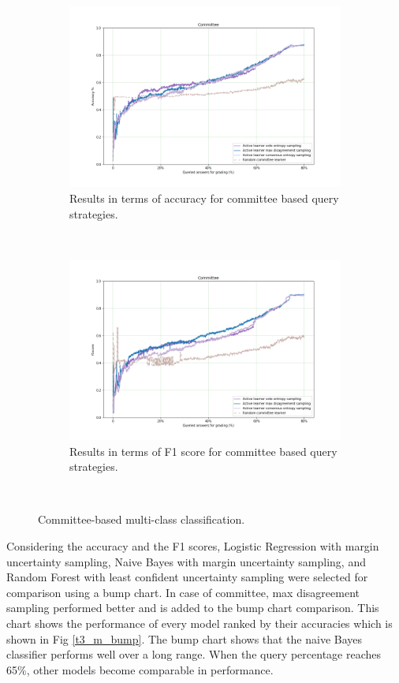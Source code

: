 \begin{figure}[!htb]
	\begin{subfigure}[b]{0.5\textwidth}
		\includegraphics[width=\textwidth]{images/task3_accuracy_com}
		\caption{Results in terms of accuracy for committee based query strategies.}
		\label{t3_m_com}
	\end{subfigure}
	~
	\begin{subfigure}[b]{0.5\textwidth}
		\includegraphics[width=\textwidth]{images/task3_f1score_com}
		\caption{Results in terms of F1 score for committee based query strategies.}
		\label{t3_m_com_f1}
	\end{subfigure}
	~
	\caption{Committee-based multi-class classification.}
\end{figure}

Considering the accuracy and the F1 scores, Logistic Regression with margin uncertainty sampling, Naive Bayes with margin uncertainty sampling, and Random Forest with least confident uncertainty sampling were selected for comparison using a bump chart. In case of committee, max disagreement sampling performed better and is added to the bump chart comparison. This chart shows the performance of every model ranked by their accuracies which is shown in Fig \ref{t3_m_bump}. The bump chart shows that the naive Bayes classifier performs well over a long range. When the query percentage reaches 65\%, other models become comparable in performance.

